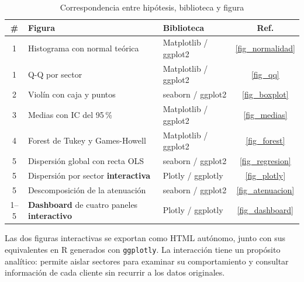         \begin{table}[H]
            \centering
            \caption{Correspondencia entre hipótesis, biblioteca y figura}
            \begin{center}
                \begin{tabular}{|c|>{\raggedright\arraybackslash}p{3.5cm}|l|c|}
                    \hline
                    \textbf{\#} & \textbf{Figura} & \textbf{Biblioteca} &
                    \textbf{Ref.} \\
                    \hline
                    1 & Histograma con normal teórica & Matplotlib / ggplot2 &
                    \ref{fig_normalidad} \\
                    \hline
                    1 & Q-Q por sector & Matplotlib / ggplot2 &
                    \ref{fig_qq} \\
                    \hline
                    2 & Violín con caja y puntos & seaborn / ggplot2 &
                    \ref{fig_boxplot} \\
                    \hline
                    3 & Medias con IC del 95\,\% & Matplotlib / ggplot2 &
                    \ref{fig_medias} \\
                    \hline
                    4 & Forest de Tukey y Games-Howell & Matplotlib / ggplot2 &
                    \ref{fig_forest} \\
                    \hline
                    5 & Dispersión global con recta OLS & seaborn / ggplot2 &
                    \ref{fig_regresion} \\
                    \hline
                    5 & Dispersión por sector \textbf{interactiva} &
                    Plotly / ggplotly & \ref{fig_plotly} \\
                    \hline
                    5 & Descomposición de la atenuación & seaborn / ggplot2 &
                    \ref{fig_atenuacion} \\
                    \hline
                    1--5 & \textbf{Dashboard} de cuatro paneles
                    \textbf{interactivo} & Plotly / ggplotly &
                    \ref{fig_dashboard} \\
                    \hline
                \end{tabular}
                \label{plan_figuras}
            \end{center}
        \end{table}

        Las dos figuras interactivas se exportan como HTML autónomo, junto con 
        sus equivalentes en R generados con \texttt{ggplotly}. La interacción 
        tiene un propósito analítico: permite aislar sectores para examinar 
        su comportamiento y consultar información de cada cliente sin recurrir 
        a los datos originales.